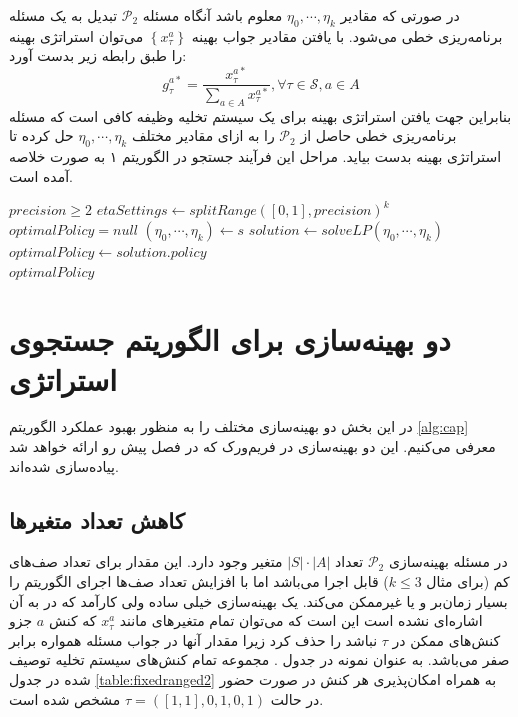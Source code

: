 در صورتی که مقادیر
$\eta_0, \cdots, \eta_k$
معلوم باشد آنگاه مسئله
$\mathcal{P}_2$
تبدیل به یک مسئله برنامه‌ریزی خطی می‌شود. با یافتن مقادیر جواب بهینه
$\left\{x_{\tau}^{a}\right\}$ 
می‌توان استراتژی بهینه را طبق رابطه زیر بدست آورد:
\begin{equation}
	g_{\tau}^{a *}=\frac{x_{\tau}^{a *}}{\sum_{a \in A} x_{\tau}^{a *}}, \forall \tau \in \mathcal{S}, a \in A
\end{equation}
بنابراین جهت یافتن استراتژی بهینه برای یک سیستم تخلیه وظیفه کافی است که مسئله برنامه‌ریزی خطی حاصل از
$\mathcal{P}_2$
را به ازای مقادیر مختلف 
$\eta_0, \cdots, \eta_k$
حل کرده تا استراتژی بهینه بدست بیاید. مراحل این فرآیند جستجو در الگوریتم ۱ به صورت خلاصه آمده است.

\begin{latin}
	\begin{algorithm}
		\begin{algorithmic}[1]
			\Require $precision \geq 2$
			\State $etaSettings \gets splitRange([0, 1], precision)^k$
			\State $optimalPolicy = null$
				\State $(\eta_0, \cdots, \eta_k) \gets s$
				\State $solution \gets solveLP(\eta_0, \cdots, \eta_k)$
					\State $optimalPolicy \gets solution.policy$
				\EndIf
			\EndFor \\
			\Return $optimalPolicy$
		\end{algorithmic}
	\end{algorithm}
\end{latin}

\section{دو بهینه‌سازی برای الگوریتم جستجوی استراتژی}
\label{sec:optim}
در این بخش دو بهینه‌سازی مختلف را به منظور بهبود عملکرد الگوریتم \ref{alg:cap} معرفی می‌کنیم. این دو بهینه‌سازی در فریم‌ورک  که در فصل پیش رو ارائه خواهد شد پیاده‌سازی شده‌اند.

\subsection{کاهش تعداد متغیرها}
\label{sub:reducevariable}
در مسئله بهینه‌سازی 
$\mathcal{P}_2$
تعداد 
$|S| \cdot |A|$
متغیر وجود دارد. این مقدار برای تعداد صف‌های کم (برای مثال $k \leq 3$) قابل اجرا می‌باشد اما با افزایش تعداد صف‌ها اجرای الگوریتم را بسیار زمان‌بر و یا غیرممکن می‌کند. یک بهینه‌سازی خیلی ساده ولی کارآمد که در \cite{Liu} به آن اشاره‌ای نشده است این است که می‌توان تمام متغیرهای مانند
$x_{\tau}^{a}$
که کنش
$a$
جزو کنش‌های ممکن در
$\tau$
نباشد را حذف کرد زیرا مقدار آنها در جواب مسئله همواره برابر صفر می‌باشد. به عنوان نمونه در جدول . مجموعه تمام کنش‌های سیستم تخلیه توصیف شده در جدول \ref{table:fixedranged2} به همراه امکان‌پذیری هر کنش در صورت حضور در حالت 
$\tau = ([1, 1], 0, 1, 0, 1)$
مشخص شده است.
